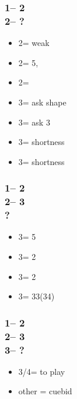 \documentclass[12pt, a4paper]{report}
\begin{document}
{{        \subsubsection*{1\nt -- 2\clubs\\
                        2\diams -- ?}
        \begin{itemize}
            \item 2\hearts = \major weak
            \item 2\spades = 5\spades, \inv
            \item 2\nt = \inv
            \item 3\clubs = ask shape
            \item 3\diams = ask 3\major
            \item 3\hearts = \clubs shortness
            \item 3\spades = \diams shortness
        \end{itemize}

        \subsubsection*{1\nt -- 2\clubs\\
                        2\diams -- 3\clubs\\
                        ?}
        \begin{itemize}
            \item 3\diams = 5\minor \qq
            \item 3\hearts = 2\spades
            \item 3\spades = 2\hearts
            \item 3\nt = 33(34)
        \end{itemize}

        \subsubsection*{1\nt -- 2\clubs\\
                        2\diams -- 3\diams\\
                        3\major -- ?}
        \begin{itemize}
            \item 3\nt/4\major = to play
            \item other = cuebid
        \end{itemize}

}}
\end{document}
